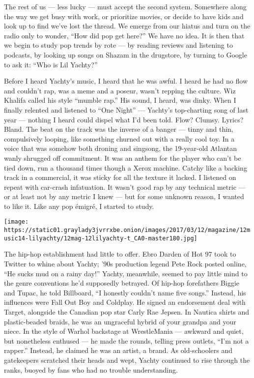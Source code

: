 The rest of us --- less lucky --- must accept the second system.
Somewhere along the way we get busy with work, or prioritize movies, or
decide to have kids and look up to find we've lost the thread. We emerge
from our hiatus and turn on the radio only to wonder, ``How did pop get
here?'' We have no idea. It is then that we begin to study pop trends by
rote --- by reading reviews and listening to podcasts, by looking up
songs on Shazam in the drugstore, by turning to Google to ask it: ``Who
is Lil Yachty?''

Before I heard Yachty's music, I heard that he was awful. I heard he had
no flow and couldn't rap, was a meme and a poseur, wasn't repping the
culture. Wiz Khalifa called his style ``mumble rap.'' His sound, I
heard, was dinky. When I finally relented and listened to ``One Night''
--- Yachty's top-charting song of last year --- nothing I heard could
dispel what I'd been told. Flow? Clumsy. Lyrics? Bland. The beat on the
track was the inverse of a banger --- tinny and thin, compulsively
looping, like something churned out with a really cool toy. In a voice
that was somehow both droning and singsong, the 19-year-old Atlantan
wanly shrugged off commitment. It was an anthem for the player who can't
be tied down, run a thousand times though a Xerox machine. Catchy like a
backing track in a commercial, it was sticky for all the texture it
lacked. I listened on repeat with car-crash infatuation. It wasn't good
rap by any technical metric --- or at least not by any metric I knew ---
but for some unknown reason, I wanted to like it. Like any pop émigré, I
started to study.

\texttt{[image: https://static01.graylady3jvrrxbe.onion/images/2017/03/12/magazine/12music14-lilyachty/12mag-12lilyachty-t\_CA0-master180.jpg]}

The hip-hop establishment had little to offer. Ebro Darden of Hot 97
took to Twitter to whine about Yachty; '90s production legend Pete Rock
posted online, ``He sucks mud on a rainy day!'' Yachty, meanwhile,
seemed to pay little mind to the genre conventions he'd supposedly
betrayed. Of hip-hop forefathers Biggie and Tupac, he told Billboard,
``I honestly couldn't name five songs.'' Instead, his influences were
Fall Out Boy and Coldplay. He signed an endorsement deal with Target,
alongside the Canadian pop star Carly Rae Jepsen. In Nautica shirts and
plastic-beaded braids, he was an ungraceful hybrid of your grandpa and
your niece. In the style of Warhol backstage at WrestleMania --- awkward
and quiet, but nonetheless enthused --- he made the rounds, telling
press outlets, ``I'm not a rapper.'' Instead, he claimed he was an
artist, a brand. As old-schoolers and gatekeepers scratched their heads
and wept, Yachty continued to rise through the ranks, buoyed by fans who
had no trouble understanding.

